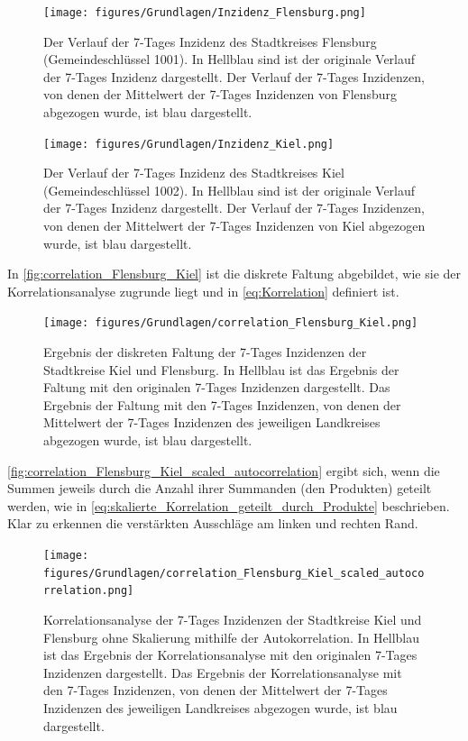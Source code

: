 \begin{figure}[H]
    \centering
    \texttt{[image: figures/Grundlagen/Inzidenz\_Flensburg.png]}
    \caption{Der Verlauf der 7-Tages Inzidenz des Stadtkreises Flensburg (Gemeindeschlüssel 1001).
    In Hellblau sind ist der originale Verlauf der 7-Tages Inzidenz dargestellt. Der Verlauf der 7-Tages Inzidenzen, von denen der Mittelwert der 7-Tages Inzidenzen von Flensburg abgezogen wurde, ist blau dargestellt.}
    \label{fig:Inzidenz_Flensburg}
\end{figure}
\begin{figure}[H]
    \centering
    \texttt{[image: figures/Grundlagen/Inzidenz\_Kiel.png]}
    \caption{Der Verlauf der 7-Tages Inzidenz des Stadtkreises Kiel (Gemeindeschlüssel 1002).
    In Hellblau sind ist der originale Verlauf der 7-Tages Inzidenz dargestellt. Der Verlauf der 7-Tages Inzidenzen, von denen der Mittelwert der 7-Tages Inzidenzen von Kiel abgezogen wurde, ist blau dargestellt.}
    \label{fig:Inzidenz_Kiel}
\end{figure}
In \autoref{fig:correlation_Flensburg_Kiel} ist die diskrete Faltung abgebildet, wie sie der Korrelationsanalyse zugrunde liegt und in \autoref{eq:Korrelation} definiert ist.
\begin{figure}[H]
    \centering
    \texttt{[image: figures/Grundlagen/correlation\_Flensburg\_Kiel.png]}
    \caption{Ergebnis der diskreten Faltung der 7-Tages Inzidenzen der Stadtkreise Kiel und Flensburg.
    In Hellblau ist das Ergebnis der Faltung mit den originalen 7-Tages Inzidenzen dargestellt. Das Ergebnis der Faltung mit den 7-Tages Inzidenzen, von denen der Mittelwert der 7-Tages Inzidenzen des jeweiligen Landkreises abgezogen wurde, ist blau dargestellt.}
    \label{fig:correlation_Flensburg_Kiel}
\end{figure}
\autoref{fig:correlation_Flensburg_Kiel_scaled_autocorrelation} ergibt sich, wenn die Summen jeweils durch die Anzahl ihrer Summanden (den Produkten) geteilt werden, wie in \autoref{eq:skalierte_Korrelation_geteilt_durch_Produkte} beschrieben. Klar zu erkennen die verstärkten Ausschläge am linken und rechten Rand.
\begin{figure}[H]
    \centering
    \texttt{[image: figures/Grundlagen/correlation\_Flensburg\_Kiel\_scaled\_autocorrelation.png]}
    \caption{Korrelationsanalyse der 7-Tages Inzidenzen der Stadtkreise Kiel und Flensburg ohne Skalierung mithilfe der Autokorrelation.
    In Hellblau ist das Ergebnis der Korrelationsanalyse mit den originalen 7-Tages Inzidenzen dargestellt. Das Ergebnis der Korrelationsanalyse mit den 7-Tages Inzidenzen, von denen der Mittelwert der 7-Tages Inzidenzen des jeweiligen Landkreises abgezogen wurde, ist blau dargestellt.}
    \label{fig:correlation_Flensburg_Kiel_scaled_autocorrelation}
\end{figure}
